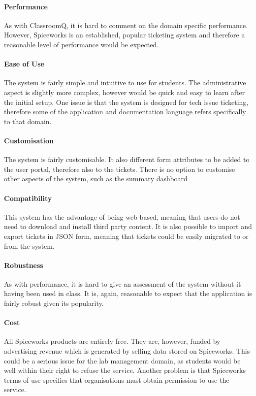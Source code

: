 \documentclass[a4paper,11pt]{article}
\begin{document}
\paragraph{Performance}
As with ClassroomQ, it is hard to comment on the domain specific performance. However, Spiceworks is an established, popular ticketing system and therefore a reasonable level of performance would be expected. 


\paragraph{Ease of Use} 

The system is fairly simple and intuitive to use for students. The administrative aspect is slightly more complex, however would be quick and easy to learn after the initial setup. One issue is that the system is designed for tech issue ticketing, therefore some of the application and documentation language refers specifically to that domain.

\paragraph{Customisation} 

The system is fairly customisable. It also different form attributes to be added to the user portal, therefore also to the tickets. There is no option to customise other aspects of the system, such as the summary dashboard


\paragraph{Compatibility}  

This system has the advantage of being web based, meaning that users do not need to download and install third party content. It is also possible to import and export tickets in JSON form, meaning that tickets could be easily migrated to or from the system.

\paragraph{Robustness}
As with performance, it is hard to give an assessment of the system without it having been used in class. It is, again, reasonable to expect that the application is fairly robust given its popularity.


\paragraph{Cost}  
All Spiceworks products are entirely free. They are, however, funded by advertising revenue which is generated by selling data stored on Spiceworks. This could be a serious issue for the lab management domain, as students would be well within their right to refuse the service. Another problem is that Spiceworks terms of use specifies that organisations must obtain permission to use the service.
\end{document}
